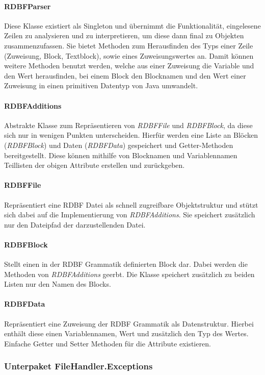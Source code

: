 \documentclass[parskip=full]{scrartcl}
\begin{document}
\paragraph{RDBFParser}
Diese Klasse existiert als Singleton und übernimmt die Funktionalität, eingelesene Zeilen zu analysieren und zu interpretieren, um diese dann final zu Objekten zusammenzufassen.
Sie bietet Methoden zum Herausfinden des Typs einer Zeile (Zuweisung, Block, Textblock), sowie eines Zuweisungswertes an.
Damit können weitere Methoden benutzt werden, welche aus einer Zuweisung die Variable und den Wert herausfinden, bei einem Block den Blocknamen und den Wert einer Zuweisung in einen primitiven Datentyp von Java umwandelt.
\paragraph{RDBFAdditions}
Abstrakte Klasse zum Repräsentieren von \textit{RDBFFile} und \textit{RDBFBlock}, da diese sich nur in wenigen Punkten unterscheiden.
Hierfür werden eine Liste an Blöcken (\textit{RDBFBlock}) und Daten (\textit{RDBFData}) gespeichert und Getter-Methoden bereitgestellt.
Diese können mithilfe von Blocknamen und Variablennamen Teillisten der obigen Attribute erstellen und zurückgeben.
\paragraph{RDBFFile}
Repräsentiert eine RDBF Datei als schnell zugreifbare Objektstruktur und stützt sich dabei auf die Implementierung von \textit{RDBFAdditions}.
Sie speichert zusätzlich nur den Dateipfad der darzustellenden Datei.
\paragraph{RDBFBlock}
Stellt einen in der RDBF Grammatik definierten Block dar. Dabei werden die Methoden von \textit{RDBFAdditions} geerbt.
Die Klasse speichert zusätzlich zu beiden Listen nur den Namen des Blocks.
\paragraph{RDBFData}
Repräsentiert eine Zuweisung der RDBF Grammatik als Datenstruktur. Hierbei enthält diese einen Variablennamen, Wert und zusätzlich den Typ des Wertes.
Einfache Getter und Setter Methoden für die Attribute existieren.
\subsubsection{Unterpaket FileHandler.Exceptions}
\end{document}
